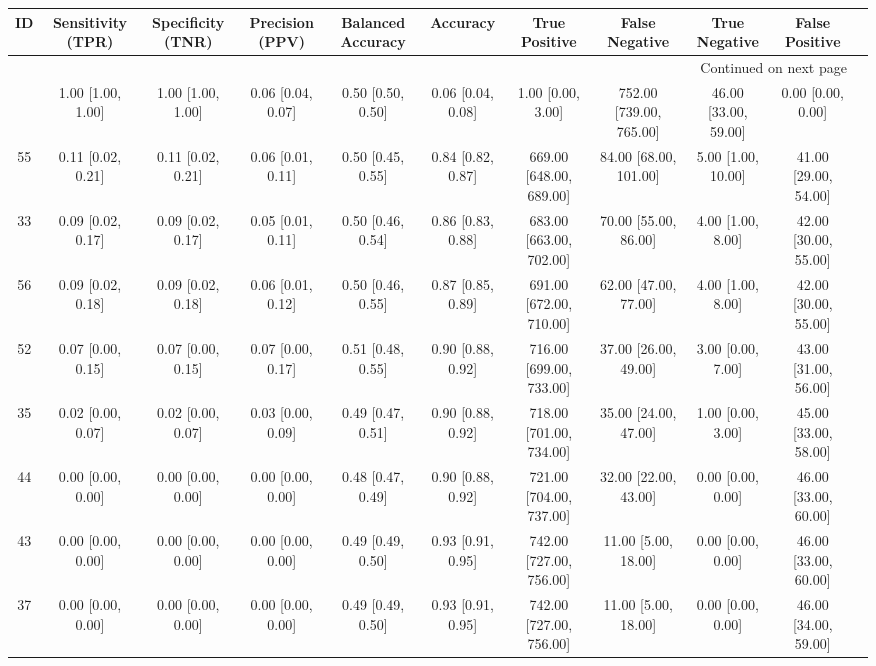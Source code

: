 \documentclass[8pt]{article}
\begin{document}
\begin{center}
\begin{footnotesize}
\begin{longtable}{|ccccccccccc|}
\toprule
 ID &  Sensitivity (TPR) &  Specificity (TNR) &    Precision (PPV) &  Balanced Accuracy &           Accuracy &            True Positive &           False Negative &         True Negative &        False Positive \\
\midrule
\endhead
\midrule
\multicolumn{10}{r}{{Continued on next page}} \\
\midrule
\endfoot

\bottomrule
\endlastfoot
 38 &  1.00 [1.00, 1.00] &  1.00 [1.00, 1.00] &  0.06 [0.04, 0.07] &  0.50 [0.50, 0.50] &  0.06 [0.04, 0.08] &        1.00 [0.00, 3.00] &  752.00 [739.00, 765.00] &  46.00 [33.00, 59.00] &     0.00 [0.00, 0.00] \\
 55 &  0.11 [0.02, 0.21] &  0.11 [0.02, 0.21] &  0.06 [0.01, 0.11] &  0.50 [0.45, 0.55] &  0.84 [0.82, 0.87] &  669.00 [648.00, 689.00] &    84.00 [68.00, 101.00] &    5.00 [1.00, 10.00] &  41.00 [29.00, 54.00] \\
 33 &  0.09 [0.02, 0.17] &  0.09 [0.02, 0.17] &  0.05 [0.01, 0.11] &  0.50 [0.46, 0.54] &  0.86 [0.83, 0.88] &  683.00 [663.00, 702.00] &     70.00 [55.00, 86.00] &     4.00 [1.00, 8.00] &  42.00 [30.00, 55.00] \\
 56 &  0.09 [0.02, 0.18] &  0.09 [0.02, 0.18] &  0.06 [0.01, 0.12] &  0.50 [0.46, 0.55] &  0.87 [0.85, 0.89] &  691.00 [672.00, 710.00] &     62.00 [47.00, 77.00] &     4.00 [1.00, 8.00] &  42.00 [30.00, 55.00] \\
 52 &  0.07 [0.00, 0.15] &  0.07 [0.00, 0.15] &  0.07 [0.00, 0.17] &  0.51 [0.48, 0.55] &  0.90 [0.88, 0.92] &  716.00 [699.00, 733.00] &     37.00 [26.00, 49.00] &     3.00 [0.00, 7.00] &  43.00 [31.00, 56.00] \\
 35 &  0.02 [0.00, 0.07] &  0.02 [0.00, 0.07] &  0.03 [0.00, 0.09] &  0.49 [0.47, 0.51] &  0.90 [0.88, 0.92] &  718.00 [701.00, 734.00] &     35.00 [24.00, 47.00] &     1.00 [0.00, 3.00] &  45.00 [33.00, 58.00] \\
 44 &  0.00 [0.00, 0.00] &  0.00 [0.00, 0.00] &  0.00 [0.00, 0.00] &  0.48 [0.47, 0.49] &  0.90 [0.88, 0.92] &  721.00 [704.00, 737.00] &     32.00 [22.00, 43.00] &     0.00 [0.00, 0.00] &  46.00 [33.00, 60.00] \\
 43 &  0.00 [0.00, 0.00] &  0.00 [0.00, 0.00] &  0.00 [0.00, 0.00] &  0.49 [0.49, 0.50] &  0.93 [0.91, 0.95] &  742.00 [727.00, 756.00] &      11.00 [5.00, 18.00] &     0.00 [0.00, 0.00] &  46.00 [33.00, 60.00] \\
 37 &  0.00 [0.00, 0.00] &  0.00 [0.00, 0.00] &  0.00 [0.00, 0.00] &  0.49 [0.49, 0.50] &  0.93 [0.91, 0.95] &  742.00 [727.00, 756.00] &      11.00 [5.00, 18.00] &     0.00 [0.00, 0.00] &  46.00 [34.00, 59.00] \\
\end{longtable}
\end{footnotesize}
\end{center}
\end{document}
